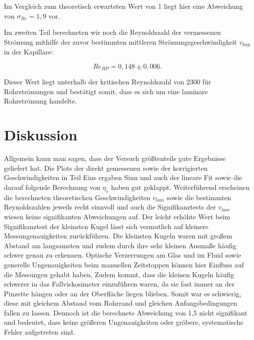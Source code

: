 \documentclass{article}
\begin{document}
Im Vergleich zum theoretisch erwarteten Wert von 1 liegt hier eine Abweichung von $\sigma_{Re} = 1,9$ vor. 

Im zweiten Teil berechneten wir noch die Reynoldszahl der vermessenen Strömung mithilfe der zuvor bestimmten mittleren Strömungsgeschwindigkeit $v_{kap}$ in der Kapillare:

\begin{equation}
    Re_{HP} = 0,148 \pm 0,006.
\end{equation}

Dieser Wert liegt unterhalb der kritischen Reynoldszahl von 2300 für Rohrströmungen und bestätigt somit, dass es sich um eine laminare Rohrströmung handelte. 

\newpage
\section{Diskussion}

Allgemein kann man sagen, dass der Versuch größtenteils gute Ergebnisse geliefert hat. Die Plots der direkt gemessenen sowie der korrigierten Geschwindigkeiten in Teil Eins ergaben Sinn und auch der lineare Fit sowie die darauf folgende Berechnung von $\eta_s$ haben gut geklappt. Weiterführend erscheinen die berechneten theoretischen Geschwindigkeiten $v_{lam}$ sowie die bestimmten Reynoldszahlen jeweils recht sinnvoll und auch die Signifikanztests der $v_{lam}$ wiesen keine signifikanten Abweichungen auf. Der leicht erhöhte Wert beim Signifikanztest der kleinsten Kugel lässt sich vermutlich auf kleinere Messungenauigkeiten zurückführen. Die kleinsten Kugeln waren mit großem Abstand am langsamsten und zudem durch ihre sehr kleinen Ausmaße häufig schwer genau zu erkennen. Optische Verzerrungen am Glas und im Fluid sowie generelle Ungenauigkeiten beim manuellen Zeitstoppen können hier Einfluss auf die Messungen gehabt haben. Zudem kommt, dass die kleinen Kugeln häufig schwerer in das Fallviskosimeter einzuführen waren, da sie fast immer an der Pinzette hängen oder an der Oberfläche liegen blieben. Somit war es schwierig, diese mit gleichem Abstand vom Rohrrand und gleichen Anfangsbedingungen fallen zu lassen. Dennoch ist die berechnete Abweichung von 1,5 nicht signifikant und bedeutet, dass keine größeren Ungenauigkeiten oder gröbere, systematische Fehler aufgetreten sind. 
\end{document}
